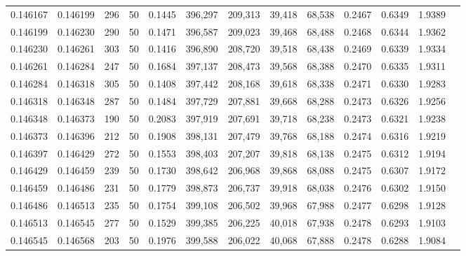 \begin{tabular}{rrrrrrrrrrrrr}
0.146167 & 0.146199 &   296 &  50 &                                     0.1445 & 396,297 & 209,313 &  39,418 &  68,538 & 0.2467 & 0.6349 & 1.9389 \\
0.146199 & 0.146230 &   290 &  50 &                                     0.1471 & 396,587 & 209,023 &  39,468 &  68,488 & 0.2468 & 0.6344 & 1.9362 \\
0.146230 & 0.146261 &   303 &  50 &                                     0.1416 & 396,890 & 208,720 &  39,518 &  68,438 & 0.2469 & 0.6339 & 1.9334 \\
0.146261 & 0.146284 &   247 &  50 &                                     0.1684 & 397,137 & 208,473 &  39,568 &  68,388 & 0.2470 & 0.6335 & 1.9311 \\
0.146284 & 0.146318 &   305 &  50 &                                     0.1408 & 397,442 & 208,168 &  39,618 &  68,338 & 0.2471 & 0.6330 & 1.9283 \\
0.146318 & 0.146348 &   287 &  50 &                                     0.1484 & 397,729 & 207,881 &  39,668 &  68,288 & 0.2473 & 0.6326 & 1.9256 \\
0.146348 & 0.146373 &   190 &  50 &                                     0.2083 & 397,919 & 207,691 &  39,718 &  68,238 & 0.2473 & 0.6321 & 1.9238 \\
0.146373 & 0.146396 &   212 &  50 &                                     0.1908 & 398,131 & 207,479 &  39,768 &  68,188 & 0.2474 & 0.6316 & 1.9219 \\
0.146397 & 0.146429 &   272 &  50 &                                     0.1553 & 398,403 & 207,207 &  39,818 &  68,138 & 0.2475 & 0.6312 & 1.9194 \\
0.146429 & 0.146459 &   239 &  50 &                                     0.1730 & 398,642 & 206,968 &  39,868 &  68,088 & 0.2475 & 0.6307 & 1.9172 \\
0.146459 & 0.146486 &   231 &  50 &                                     0.1779 & 398,873 & 206,737 &  39,918 &  68,038 & 0.2476 & 0.6302 & 1.9150 \\
0.146486 & 0.146513 &   235 &  50 &                                     0.1754 & 399,108 & 206,502 &  39,968 &  67,988 & 0.2477 & 0.6298 & 1.9128 \\
0.146513 & 0.146545 &   277 &  50 &                                     0.1529 & 399,385 & 206,225 &  40,018 &  67,938 & 0.2478 & 0.6293 & 1.9103 \\
0.146545 & 0.146568 &   203 &  50 &                                     0.1976 & 399,588 & 206,022 &  40,068 &  67,888 & 0.2478 & 0.6288 & 1.9084 \\

\end{tabular}

